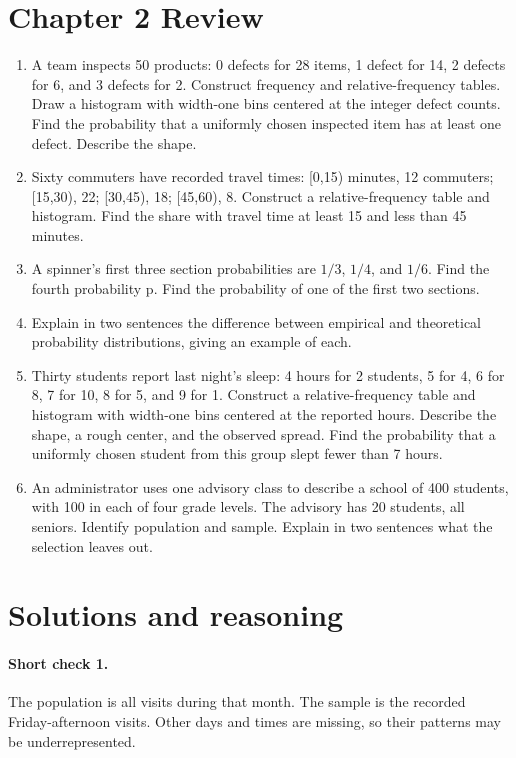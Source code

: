 \documentclass[12pt,letterpaper]{article}
\begin{document}
\section*{Chapter 2 Review}
\begin{enumerate}[label=R\arabic*.,leftmargin=2.5em,itemsep=10pt]
\item A team inspects 50 products: 0 defects for 28 items, 1 defect for 14, 2 defects for 6, and 3 defects for 2. Construct frequency and relative-frequency tables. Draw a histogram with width-one bins centered at the integer defect counts. Find the probability that a uniformly chosen inspected item has at least one defect. Describe the shape.
\item Sixty commuters have recorded travel times: [0,15) minutes, 12 commuters; [15,30), 22; [30,45), 18; [45,60), 8. Construct a relative-frequency table and histogram. Find the share with travel time at least 15 and less than 45 minutes.
\item A spinner's first three section probabilities are $1/3$, $1/4$, and $1/6$. Find the fourth probability p. Find the probability of one of the first two sections.
\item Explain in two sentences the difference between empirical and theoretical probability distributions, giving an example of each.
\item Thirty students report last night's sleep: 4 hours for 2 students, 5 for 4, 6 for 8, 7 for 10, 8 for 5, and 9 for 1. Construct a relative-frequency table and histogram with width-one bins centered at the reported hours. Describe the shape, a rough center, and the observed spread. Find the probability that a uniformly chosen student from this group slept fewer than 7 hours.
\item An administrator uses one advisory class to describe a school of 400 students, with 100 in each of four grade levels. The advisory has 20 students, all seniors. Identify population and sample. Explain in two sentences what the selection leaves out.
\end{enumerate}

\clearpage\section*{Solutions and reasoning}

\paragraph{Short check 1.}
The population is all visits during that month. The sample is the recorded Friday-afternoon visits. Other days and times are missing, so their patterns may be underrepresented.
\end{document}

